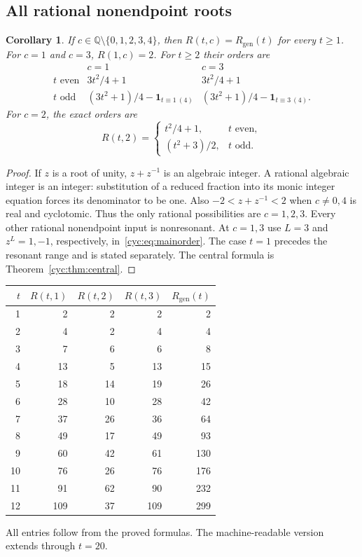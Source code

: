 \documentclass[11pt,a4paper]{article}
\numberwithin{equation}{section}
\newtheorem{corollary}[theorem]{Corollary}
\theoremstyle{definition}
\theoremstyle{remark}
\newcommand{\QQ}{\mathbb Q}
\newcommand{\Rgen}{R_{\mathrm{gen}}}
\newcommand{\ind}{\mathbf 1}
\begin{document}
\subsection{All rational nonendpoint roots}
\begin{corollary}\label{cyc:cor:rational}
If $c\in\QQ\setminus\{0,1,2,3,4\}$, then
$R(t,c)=\Rgen(t)$ for every $t\ge1$.
For $c=1$ and $c=3$, $R(1,c)=2$.  For $t\ge2$ their orders are
\begin{equation}\label{cyc:eq:rationalorders}
 \begin{array}{c|cc}
 &c=1&c=3\\ \hline
 t\text{ even}&3t^2/4+1&3t^2/4+1\\[1mm]
 t\text{ odd}&(3t^2+1)/4-\ind_{t\equiv1\ (4)}
             &(3t^2+1)/4-\ind_{t\equiv3\ (4)}.
 \end{array}
\end{equation}
For $c=2$, the exact orders are
\begin{equation}\label{cyc:eq:centralorders}
 R(t,2)=
 \begin{cases}t^2/4+1,&t\text{ even},\\(t^2+3)/2,&t\text{ odd}.
 \end{cases}
\end{equation}
\end{corollary}
\begin{proof}
If $z$ is a root of unity, $z+z^{-1}$ is an algebraic integer.
A rational algebraic integer is an integer: substitution of a reduced
fraction into its monic integer equation forces its denominator to be
one.  Also $-2<z+z^{-1}<2$ when $c\ne0,4$ is real and cyclotomic.
Thus the only rational possibilities are $c=1,2,3$.  Every other
rational nonendpoint input is nonresonant.  At $c=1,3$ use $L=3$
and $z^L=1,-1$, respectively, in~\eqref{cyc:eq:mainorder}.  The case
$t=1$ precedes the resonant range and is stated separately.
The central formula is Theorem~\ref{cyc:thm:central}.
\end{proof}

\begin{center}
\renewcommand{\arraystretch}{1.08}
\begin{tabular}{@{}rrrrr@{}}
\toprule
$t$&$R(t,1)$&$R(t,2)$&$R(t,3)$&$\Rgen(t)$\\
\midrule
1&2&2&2&2\\
2&4&2&4&4\\
3&7&6&6&8\\
4&13&5&13&15\\
5&18&14&19&26\\
6&28&10&28&42\\
7&37&26&36&64\\
8&49&17&49&93\\
9&60&42&61&130\\
10&76&26&76&176\\
11&91&62&90&232\\
12&109&37&109&299\\
\bottomrule
\end{tabular}
\end{center}
All entries follow from the proved formulas.  The machine-readable
version extends through $t=20$.
\end{document}
